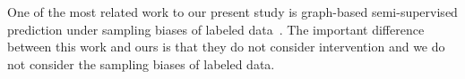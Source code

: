 One of the most related work to our present study is graph-based semi-supervised prediction under sampling biases of labeled data~\cite{zhou2019graph}.
The important difference between this work and ours is that they do not consider intervention and we do not consider the sampling biases of labeled data. 






